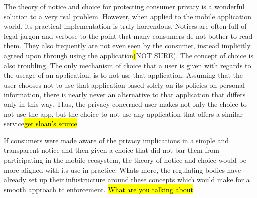 The theory of notice and choice for protecting consumer privacy is a wonderful solution to a very real problem. However, when applied to the mobile application world, its practical implementation is truly horrendous. Notices are often full of legal jargon and verbose to the point that many consumers do not bother to read them\cite{something}. They also frequently are not even seen by the consumer, instead implicitly agreed upon through using the application\hl(NOT SURE). The concept of choice is also troubling. The only mechanism of choice that a user is given with regards to the useage of an application, is to not use that application. Assuming that the user chooses not to use that application based solely on its policies on personal information, there is nearly never an alternative to that application that differs only in this way. Thus, the privacy concerned user makes not only the choice to not use the app, but the choice to not use any application that offers a similar service\hl{get sloan's source}. 

If consumers were made aware of the privacy implications in a simple and transparent notice and then given a choice that did not bar them from participating in the mobile ecosystem, the theory of notice and choice would be more aligned with its use in practice. Whats more, the regulating bodies have already set up their infustructure around these concepts which would make for a smooth approach to enforcement. \hl{What are you talking about}




